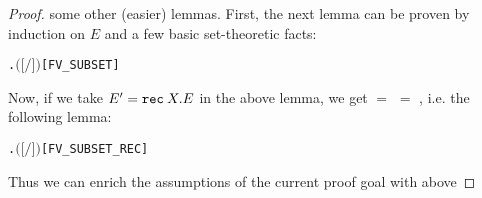 \begin{proof}
some other (easier) lemmas. First, the next lemma can be  proven
by  induction on $E$ and a few basic set-theoretic facts:
\begin{alltt}
\HOLTokenTurnstile{} \HOLSymConst{\HOLTokenForall{}}  .  \ensuremath{(}\ensuremath{[}\ensuremath{/}\ensuremath{]} \ensuremath{)} \HOLSymConst{\HOLTokenSubset{}}   \HOLSymConst{\HOLTokenUnion{}}  \hfill{[FV_SUBSET]}
\end{alltt}
Now, if we take $E' = {\tt rec}\: X . E$ in the above lemma, we get
 $=$  $=$
, i.e. the following lemma:
\begin{alltt}
\HOLTokenTurnstile{} \HOLSymConst{\HOLTokenForall{}} .  \ensuremath{(}\ensuremath{[}  \ensuremath{/}\ensuremath{]} \ensuremath{)} \HOLSymConst{\HOLTokenSubset{}}  \hfill{[FV_SUBSET_REC]}
\end{alltt}
Thus we can enrich the assumptions of the current proof goal with above

\end{proof}

